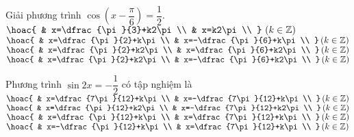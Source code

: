\begin{ex}%
	Giải phương trình $\cos \left( x-\dfrac{\pi}{6} \right)=\dfrac{1}{2}$.
	\choice
	{$\hoac{
			& x=\dfrac{\pi}{3}+k2\pi\\
			& x=k2\pi\\
		}\,\left( k\in \mathbb{Z} \right)$}
	{$\hoac{
			& x=\dfrac{\pi}{2}+k\pi\\
			& x=-\dfrac{\pi}{6}+k\pi\\
		}\left( k\in \mathbb{Z} \right)$}
	{$\hoac{
			& x=\dfrac{\pi}{2}+k2\pi\\
			& x=\dfrac{\pi}{6}+k2\pi\\
		}\left( k\in \mathbb{Z} \right)$}
	{\True $\hoac{
			& x=\dfrac{\pi}{2}+k2\pi\\
			& x=-\dfrac{\pi}{6}+k2\pi\\
		}\left( k\in \mathbb{Z} \right)$}
\end{ex}
\begin{ex}%
	Phương trình $\sin 2x=-\dfrac{1}{2}$ có tập nghiệm là
	\choice
	{$\hoac{
			& x=\dfrac{7\pi}{12}+k\pi\\
			& x=-\dfrac{7\pi}{12}+k\pi\\
		}\left( k\in \mathbb{Z} \right)$}
	{$\hoac{
			& x=\dfrac{\pi}{12}+k2\pi\\
			& x=-\dfrac{7\pi}{12}+k2\pi\\
		}\left( k\in \mathbb{Z} \right)$}
	{$\hoac{
			& x=\dfrac{\pi}{12}+k\pi\\
			& x=\dfrac{7\pi}{12}+k\pi\\
		}\left( k\in \mathbb{Z} \right)$}
	{\True $\hoac{
			& x=-\dfrac{\pi}{12}+k\pi\\
			& x=\dfrac{7\pi}{12}+k\pi\\
		}\left( k\in \mathbb{Z} \right)$}
\end{ex}
